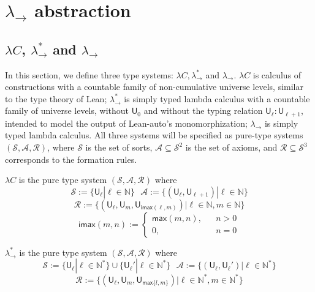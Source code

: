 \section{$\lambda_\to$ abstraction}

\subsection{$\lambda C$, $\lambda_\to^*$ and $\lambda_\to$}

In this section, we define three type systems: $\lambda C, \lambda_\to^*$ and $\lambda_\to$. $\lambda C$
is calculus of constructions with a countable family of non-cumulative universe levels, similar
to the type theory of Lean; $\lambda_\to^*$ is simply typed lambda calculus with a countable
family of universe levels, without $\mathsf{U}_0$ and without the typing relation
$\mathsf{U}_\ell : \mathsf{U}_{\ell + 1}$, intended to model the output of Lean-auto's
monomorphization; $\lambda_\to$ is simply typed lambda calculus. All three systems will be
specified as pure-type systems $(\mathcal{S}, \mathcal{A}, \mathcal{R})$, where $\mathcal{S}$
is the set of sorts, $\mathcal{A} \subseteq \mathcal{S}^2$ is the set of axioms, and
$\mathcal{R} \subseteq \mathcal{S}^3$ corresponds to the formation rules.

\begin{definition} $\lambda C$ is the pure type system $(\mathcal{S}, \mathcal{A}, \mathcal{R})$ where
  $$\mathcal{S} := \{\mathsf{U}_\ell | \ell \in \mathbb{N}\} \ \ \ \mathcal{A} := \{(\mathsf{U}_\ell, \mathsf{U}_{\ell + 1}) | \ell \in \mathbb{N}\}$$
  $$\mathcal{R} := \{(\mathsf{U}_\ell, \mathsf{U}_m, \mathsf{U}_{\mathsf{imax}(\ell, m)}) | \ell \in \mathbb{N}, m \in \mathbb{N}\}$$
  $$\mathsf{imax}(m, n) := \left\{\begin{aligned}
    \mathsf{max}(m, n), & & n > 0 \\
    0, & & n = 0
  \end{aligned}\right.$$  
\end{definition}

\begin{definition} $\lambda_\to^*$ is the pure type system $(\mathcal{S}, \mathcal{A}, \mathcal{R})$ where
  $$\mathcal{S} := \{\mathsf{U}_\ell | \ell \in \mathbb{N}^*\} \cup \{\mathsf{U}_\ell' | \ell \in \mathbb{N}^*\} \ \ \
    \mathcal{A} := \{(\mathsf{U}_\ell, \mathsf{U}_\ell') | \ell \in \mathbb{N}^*\}$$
  $$\mathcal{R} := \{(\mathsf{U}_\ell, \mathsf{U}_m, \mathsf{U}_{\mathsf{max} \{l, m\}}) | \ell \in \mathbb{N}^*, m \in \mathbb{N}^*\}$$
\end{definition}


